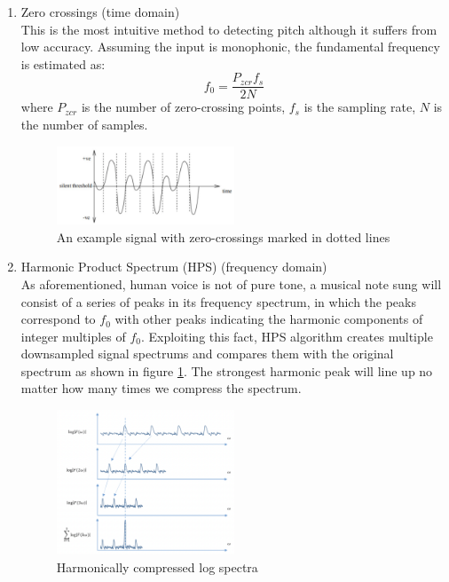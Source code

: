 \begin{enumerate}
    \item Zero crossings (time domain)\\
    This is the most intuitive method to detecting pitch although it suffers from low accuracy.
    Assuming the input is monophonic, the fundamental frequency is estimated as:
    \[f_0 = \frac{P_{zcr}f_s}{2N}\]
    where $P_{zcr}$ is the number of zero-crossing points, $f_s$ is the sampling rate,
    $N$ is the number of samples.
    \begin{figure}[h]
        \centering
        \includegraphics[width=0.5\textwidth]{Figures/zcr.png}
        \caption{An example signal with zero-crossings marked in dotted lines }
    \end{figure}

    \item Harmonic Product Spectrum (HPS) (frequency domain)\\
    As aforementioned, human voice is not of pure tone, a musical note sung will consist of a series of peaks in its frequency spectrum,
    in which the peaks correspond to $f_0$ with other peaks indicating the harmonic components of integer multiples of $f_0$. 
    Exploiting this fact, HPS algorithm creates multiple downsampled signal spectrums and compares them with the original spectrum as shown in figure 
    \ref{HPS}. The strongest harmonic peak will line up no matter how many times we compress the spectrum.
    
    \begin{figure}[h]
        \centering
        \includegraphics[width=0.5\textwidth]{Figures/HPS.png}
        \caption{Harmonically compressed log spectra }
        \label{HPS}
    \end{figure}
    

\end{enumerate}
